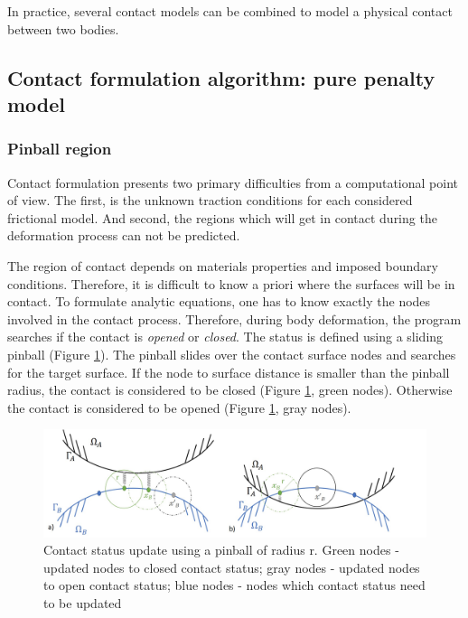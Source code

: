 In practice, several contact models can be combined to model a physical contact between two bodies.   

\subsection{Contact formulation algorithm: pure penalty model}%

\subsubsection*{Pinball region}

Contact formulation presents two primary difficulties from a computational point of view. The first, is the unknown traction conditions for each considered frictional model. And second, the regions which will get in contact during the deformation process can not be predicted.

The region of contact depends on materials properties and imposed boundary conditions. Therefore, it is difficult to know a priori where the surfaces will be in contact. To formulate analytic equations, one has to know exactly the nodes involved in the contact process. Therefore, during body deformation, the program searches if the contact is \textit{opened} or \textit{closed}. The status is defined using a sliding pinball (Figure \ref{fig:pinball}). The pinball slides over the contact surface nodes and searches for the target surface. If the node to surface distance is smaller than the pinball radius, the contact is considered to be closed (Figure \ref{fig:pinball}, green nodes). Otherwise the contact is considered to be opened (Figure \ref{fig:pinball}, gray nodes).    

\begin{figure}[!h]
\centering
\includegraphics[width=1\textwidth,keepaspectratio]{figures/pinball.jpg} 
\caption{Contact status update using a pinball of radius r. Green nodes - updated nodes to closed contact status; gray nodes - updated nodes to open contact status; blue nodes - nodes which contact status need to be updated}
\label{fig:pinball}
\end{figure}

